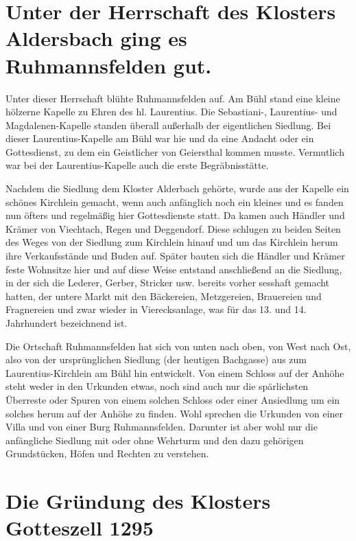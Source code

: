 \documentclass[12pt,a4paper]{book}
\begin{document}
\section{Unter der Herrschaft des Klosters Aldersbach ging es Ruhmannsfelden gut.}

Unter dieser Herrschaft blühte Ruhmannsfelden auf. Am Bühl stand eine
kleine hölzerne Kapelle zu Ehren des hl. Laurentius. Die Sebastiani-,
Laurentius- und Magdalenen-Kapelle standen überall außerhalb der
eigentlichen Siedlung. Bei dieser Laurentius-Kapelle am Bühl war hie und
da eine Andacht oder ein Gottesdienst, zu dem ein Geistlicher von
Geiersthal kommen musste. Vermutlich war bei der Laurentius-Kapelle auch
die erste Begräbnisstätte.

Nachdem die Siedlung dem Kloster Alderbach gehörte, wurde aus der
Kapelle ein schönes Kirchlein gemacht, wenn auch anfänglich noch ein
kleines und es fanden nun öfters und regelmäßig hier Gottesdienste
statt. Da kamen auch Händler und Krämer von Viechtach, Regen und
Deggendorf. Diese schlugen zu beiden Seiten des Weges von der Siedlung
zum Kirchlein hinauf und um das Kirchlein herum ihre Verkaufsstände und
Buden auf. Später bauten sich die Händler und Krämer feste Wohnsitze
hier und auf diese Weise entstand anschließend an die Siedlung, in der
sich die Lederer, Gerber, Stricker usw. bereits vorher sesshaft gemacht
hatten, der untere Markt mit den Bäckereien, Metzgereien, Brauereien und
Fragnereien und zwar wieder in Vierecksanlage, was für das 13. und 14.
Jahrhundert bezeichnend ist.

Die Ortschaft Ruhmannsfelden hat sich von unten nach oben, von West nach
Ost, also von der ursprünglichen Siedlung (der heutigen Bachgasse) aus
zum Laurentius-Kirchlein am Bühl hin entwickelt. Von einem Schloss auf
der Anhöhe steht weder in den Urkunden etwas, noch sind auch nur die
spärlichsten Überreste oder Spuren von einem solchen Schloss oder einer
Ansiedlung um ein solches herum auf der Anhöhe zu finden. Wohl sprechen
die Urkunden von einer Villa und von einer Burg Ruhmannsfelden. Darunter
ist aber wohl nur die anfängliche Siedlung mit oder ohne Wehrturm und
den dazu gehörigen Grundstücken, Höfen und Rechten zu verstehen.

\section{Die Gründung des Klosters Gotteszell 1295}
\end{document}
